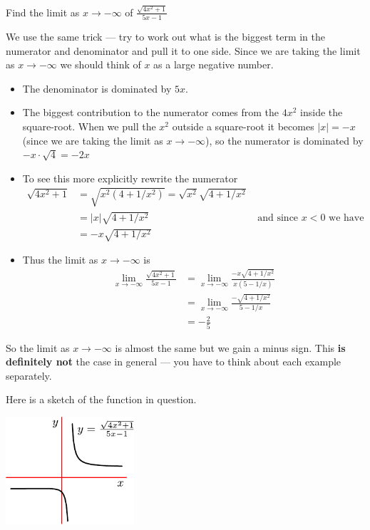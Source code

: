 \begin{eg}\label{eg lim tricky part2}
 Find the limit as $x \to -\infty$ of $\frac{\sqrt{4x^2+1}}{5x-1}$

We use the same trick --- try to work out what is the biggest term in the
numerator and denominator and pull it to one side. Since we are taking the
limit as $x \to -\infty$ we should think of $x$ as a large negative number.
\begin{itemize}
 \item The denominator is dominated by $5x$.
 \item The biggest contribution to the numerator comes from the $4x^2$ inside
the square-root. When we pull the $x^2$ outside a square-root it becomes $|x| =
-x$ (since we are taking the limit as $x \to -\infty$), so the numerator is
dominated by $-x\cdot\sqrt{4} = -2x$
 \item To see this more explicitly rewrite the numerator
\begin{align*}
  \sqrt{4x^2+1} &= \sqrt{x^2 (4+1/x^2)}  = \sqrt{x^2} \sqrt{4+1/x^2} \\
  &= |x|\sqrt{4+1/x^2} & \text{ and since $x<0$ we have} \\
  & = -x\sqrt{4+1/x^2}
\end{align*}
\item Thus the limit as $x \to -\infty$ is
\begin{align*}
 \lim_{x \to -\infty} \frac{\sqrt{4x^2+1}}{5x-1}
 &= \lim_{x \to -\infty} \frac{-x \sqrt{4+1/x^2}}{x(5-1/x)}\\
 &= \lim_{x \to -\infty} \frac{-\sqrt{4+1/x^2}}{5-1/x} \\
 & = -\frac{2}{5}
\end{align*}
\end{itemize}
\end{eg}
So the limit as $x \to -\infty$ is almost the same but we gain a minus sign.
This \textbf{is definitely not} the case in general --- you have to think about each
example separately.

Here is a sketch of the function in question.
\begin{fig}
\begin{center}
 \includegraphics[height=4cm]{neg_inf_lim}
\end{center}
\end{fig}


